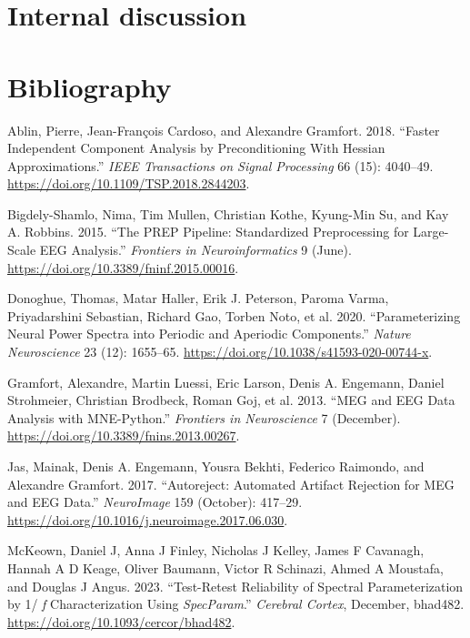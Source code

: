 \documentclass[
  letterpaper,
  DIV=11,
  numbers=noendperiod]{scrartcl}
\newlength{\cslhangindent}
\newenvironment{CSLReferences}[2] %
 {\begin{list}{}{%
  \setlength{\itemindent}{0pt}
  \setlength{\leftmargin}{0pt}
  \setlength{\parsep}{0pt}
  \ifodd #1
   \setlength{\leftmargin}{\cslhangindent}
   \setlength{\itemindent}{-1\cslhangindent}
  \fi
  \setlength{\itemsep}{#2\baselineskip}}}
 {\end{list}}
\begin{document}
\section{Internal discussion}\label{internal-discussion}

\section*{Bibliography}\label{bibliography}

\label{refs}
\begin{CSLReferences}{1}{0}
Ablin, Pierre, Jean-François Cardoso, and Alexandre Gramfort. 2018.
{``Faster {Independent Component Analysis} by {Preconditioning With
Hessian Approximations}.''} \emph{IEEE Transactions on Signal
Processing} 66 (15): 4040--49.
\url{https://doi.org/10.1109/TSP.2018.2844203}.

Bigdely-Shamlo, Nima, Tim Mullen, Christian Kothe, Kyung-Min Su, and Kay
A. Robbins. 2015. {``The {PREP} Pipeline: Standardized Preprocessing for
Large-Scale {EEG} Analysis.''} \emph{Frontiers in Neuroinformatics} 9
(June). \url{https://doi.org/10.3389/fninf.2015.00016}.

Donoghue, Thomas, Matar Haller, Erik J. Peterson, Paroma Varma,
Priyadarshini Sebastian, Richard Gao, Torben Noto, et al. 2020.
{``Parameterizing Neural Power Spectra into Periodic and Aperiodic
Components.''} \emph{Nature Neuroscience} 23 (12): 1655--65.
\url{https://doi.org/10.1038/s41593-020-00744-x}.

Gramfort, Alexandre, Martin Luessi, Eric Larson, Denis A. Engemann,
Daniel Strohmeier, Christian Brodbeck, Roman Goj, et al. 2013. {``{MEG}
and {EEG} Data Analysis with {MNE-Python}.''} \emph{Frontiers in
Neuroscience} 7 (December).
\url{https://doi.org/10.3389/fnins.2013.00267}.

Jas, Mainak, Denis A. Engemann, Yousra Bekhti, Federico Raimondo, and
Alexandre Gramfort. 2017. {``Autoreject: {Automated} Artifact Rejection
for {MEG} and {EEG} Data.''} \emph{NeuroImage} 159 (October): 417--29.
\url{https://doi.org/10.1016/j.neuroimage.2017.06.030}.

McKeown, Daniel J, Anna J Finley, Nicholas J Kelley, James F Cavanagh,
Hannah A D Keage, Oliver Baumann, Victor R Schinazi, Ahmed A Moustafa,
and Douglas J Angus. 2023. {``Test-Retest Reliability of Spectral
Parameterization by 1/ {\emph{f}} Characterization Using
{\emph{SpecParam}}.''} \emph{Cerebral Cortex}, December, bhad482.
\url{https://doi.org/10.1093/cercor/bhad482}.

\end{CSLReferences}
\end{document}
